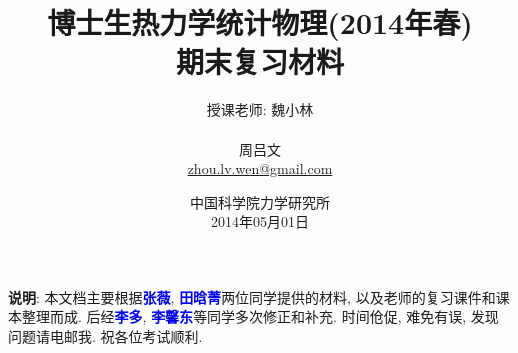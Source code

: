 \documentclass[a4paper,titlepage,twocolumn]{caspset}
\begin{document}
\title{博士生热力学统计物理(2014年春)\\期末复习材料
 \vspace{-20pt}}
\author{{\Large 授课老师: 魏小林}\\ \vspace{50pt}\\ 周吕文\\ \href{mailto:zhou.lv.wen@gmail.com}{zhou.lv.wen@gmail.com}\\ \vspace{50pt}}
\date{中国科学院力学研究所\\2014年05月01日}
\maketitle


\setcounter{page}{0}
\textbf{说明}: 本文档主要根据\textcolor{blue}{\bf 张薇}, \textcolor{blue}{\bf 田晗菁}两位同学提供的材料, 以及老师的复习课件和课本整理而成. 后经\textcolor{blue}{\bf 李多}, \textcolor{blue}{\bf 李馨东}等同学多次修正和补充. 时间伧促, 难免有误, 发现问题请电邮我. 祝各位考试顺利.
\tableofcontents


\newpage





\setcounter{section}{5}


\setcounter{section}{8}


\end{document}
